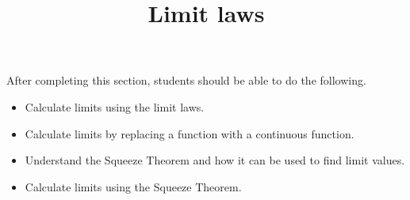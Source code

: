 \documentclass{ximera}
\title{Limit laws}
\begin{document}
\begin{abstract}
\end{abstract}

\maketitle

\begin{sectionOutcomes}
After completing this section, students should be able to do the following.

\begin{itemize}
\item Calculate limits using the limit laws.
 \item Calculate limits by replacing a function with a continuous
  function.
\item Understand the Squeeze Theorem and how it can be used to find limit values.
\item Calculate limits using the Squeeze Theorem.
\end{itemize}
\end{sectionOutcomes}
\end{document}

